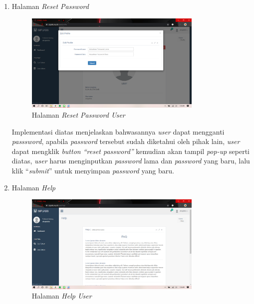 \begin{enumerate}
	\item Halaman \textit{Reset Password}
	\begin{figure}
		\centering
		\includegraphics[width=0.8\textwidth]
		{pics/user/implementasi/resetpassword.png}
		\caption{Halaman \textit{Reset Password User}}
		\label{fig:CC10}
	\end{figure}
	
	Implementasi diatas menjelaskan bahwasannya \textit{user} dapat mengganti \textit{passsword}, apabila \textit{password} tersebut sudah diketahui oleh pihak lain, \textit{user} dapat mengklik \textit{button “reset password”} kemudian akan tampil\textit{ pop-up} seperti diatas, \textit{user} harus menginputkan \textit{password} lama dan \textit{password} yang baru, lalu klik “\textit{submit}” untuk menyimpan \textit{password} yang baru.
	
	\item Halaman \textit{Help}
	\begin{figure}
		\centering
		\includegraphics[width=0.8\textwidth]
		{pics/user/implementasi/help.png}
		\caption{Halaman \textit{Help User}}
		\label{fig:CC10}
	\end{figure}


\end{enumerate}
